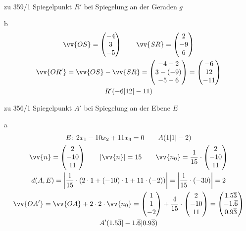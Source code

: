 \begin{exercise}{zu 359/1}
  Spiegelpunkt $R'$ bei Spiegelung an der Geraden $g$
  \item [b]
  \begin{gather*}
    \vv{OS} = \begin{pmatrix}-4 \\ 3 \\ -5\end{pmatrix} \qquad \vv{SR} = \begin{pmatrix}2 \\ -9 \\ 6\end{pmatrix} \\
    \vv{OR'} = \vv{OS} - \vv{SR} = \begin{pmatrix}-4 - 2 \\ 3 - (-9) \\ -5 - 6\end{pmatrix} = \begin{pmatrix}-6 \\ 12 \\ -11\end{pmatrix} \\
    R'(-6|12|-11)
  \end{gather*}
\end{exercise}
\begin{exercise}{zu 356/1}
  Spiegelpunkt $A'$ bei Spiegelung an der Ebene $E$
  \item [a]
  \begin{gather*}
    E \colon 2x_1 - 10x_2 + 11x_3 = 0 \qquad A(1|1|-2) \\
    \vv{n} = \begin{pmatrix}2 \\ -10 \\ 11\end{pmatrix} \qquad |\vv{n}| = 15 \qquad \vv{n_0} = \frac{1}{15} \cdot \begin{pmatrix}2 \\ -10 \\ 11\end{pmatrix} \\
    d(A, E) = \left|\frac{1}{15} \cdot (2 \cdot 1 + (-10) \cdot 1 + 11 \cdot (-2))\right| = \left|\frac{1}{15} \cdot (-30)\right| = 2 \\
    \vv{OA'} = \vv{OA} + 2 \cdot 2 \cdot \vv{n_0} = \begin{pmatrix}1 \\ 1 \\ -2\end{pmatrix} + \frac{4}{15} \cdot \begin{pmatrix}2 \\ -10 \\ 11\end{pmatrix} = \begin{pmatrix}1.5\overline{3} \\ -1.\overline{6} \\ 0.9\overline{3}\end{pmatrix} \\
    A'(1.5\overline{3}|-1.\overline{6}|0.9\overline{3})
  \end{gather*}
\end{exercise}
